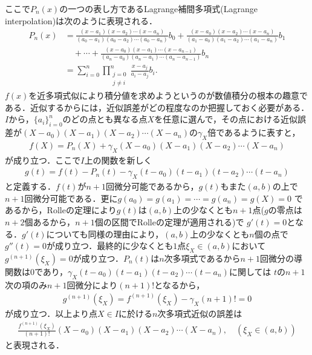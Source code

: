 \documentclass[a4j,papersize,disablejfam,slide,14pt]{jsarticle}
\begin{document}
    ここで$P_n(x)$の一つの表し方である{\rm Lagrange}補間多項式({\rm Lagrange interpolation})は次のように表現される．
    \begin{align}
    	P_n(x) &= \frac{(x-a_1)(x-a_2)\cdots(x-a_n)}{(a_0-a_1)(a_0-a_2)\cdots(a_0-a_n)}b_0 + \frac{(x-a_0)(x-a_2)\cdots(x-a_n)}{(a_1-a_0)(a_1-a_2)\cdots(a_1-a_n)}b_1 \\
        &\quad + \cdots + \frac{(x-a_0)(x-a_1)\cdots(x-a_{n-1})}{(a_n-a_0)(a_n-a_1)\cdots(a_n-a_{n-1})}b_n\\
        &= \sum_{i=0}^{n} \prod_{\substack{j=0\\j \neq i}}^{n} \frac{x-a_j}{a_i - a_j} b_i.
    \end{align}
    $f(x)$を近多項式似により積分値を求めようというのが数値積分の根本の趣意である．近似するからには，近似誤差がどの程度なのか把握しておく必要がある．
    $I$から，$\{a_i\}_{i=0}^{n}$のどの点とも異なる点$X$を任意に選んで，その点における近似誤差が$(X-a_0)(X-a_1)(X-a_2)\cdots(X-a_n)$の$\gamma_X$倍であるように表すと，
    \begin{align}
    	f(X) = P_n(X) + \gamma_X(X-a_0)(X-a_1)(X-a_2)\cdots(X-a_n)
    \end{align}
    が成り立つ．ここで$I$上の関数を新しく
    \begin{align}
    	g(t) = f(t) - P_n(t) - \gamma_X(t-a_0)(t-a_1)(t-a_2)\cdots(t-a_n)
    \end{align}
    と定義する．$f(t)$が$n+1$回微分可能であるから，$g(t)$もまた$(a,b)$の上で$n+1$回微分可能である．更に$g(a_0) = g(a_1) = \cdots = g(a_n) = g(X) = 0$
    であるから，{\rm Rolle}の定理により$g(t)$は$(a,b)$上の少なくとも$n+1$点($g$の零点は$n+2$個あるから，$n+1$個の区間で{\rm Rolle}の定理が適用される)で
    $g'(t) = 0$となる．$g'(t)$についても同様の理由により，$(a,b)$上の少なくとも$n$個の点で$g''(t)=0$が成り立つ．最終的に少なくとも$1$点$\xi_X \in (a,b)$において
    $g^{(n+1)}(\xi_X)=0$が成り立つ．$P_n(t)$は$n$次多項式であるから$n+1$回微分の導関数は$0$であり，$\gamma_X(t-a_0)(t-a_1)(t-a_2)\cdots(t-a_n)$に関しては
    $t$の$n+1$次の項のみ$n+1$回微分により$(n+1)!$となるから，
    \begin{align}
    	g^{(n+1)}(\xi_X) = f^{(n+1)}(\xi_X) - \gamma_X(n+1)! = 0
    \end{align}
    が成り立つ．以上より点$X \in I$に於ける$n$次多項式近似の誤差は
    \begin{align}
    	\frac{f^{(n+1)}(\xi_X)}{(n+1)!}(X-a_0)(X-a_1)(X-a_2)\cdots(X-a_n), \quad (\xi_X \in (a,b))
    \end{align}
    と表現される．
\end{document}
